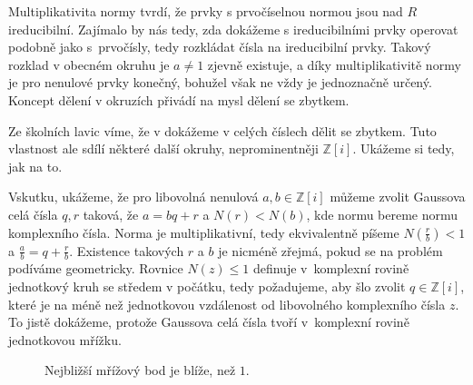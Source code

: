 \documentclass[12pt]{report}
\begin{document}
Multiplikativita normy tvrdí, že prvky s prvočíselnou normou jsou nad $R$ ireducibilní. Zajímalo by nás tedy, zda dokážeme s ireducibilními prvky operovat podobně jako s~prvočísly, tedy rozkládat čísla na ireducibilní prvky. Takový rozklad v obecném okruhu je $a \neq 1$ zjevně existuje, a díky multiplikativitě normy je pro nenulové prvky konečný, bohužel však ne vždy je jednoznačně určený. Koncept dělení v okruzích přivádí na mysl dělení se zbytkem.

Ze školních lavic víme, že v dokážeme v celých číslech dělit se zbytkem. Tuto vlastnost ale sdílí některé další okruhy, neprominentněji $\mathbb{Z}[i]$. Ukážeme si tedy, jak na to.

Vskutku, ukážeme, že pro libovolná nenulová $a,b \in \mathbb{Z}[i]$ můžeme zvolit Gaussova celá čísla $q,r$ taková, že $a = bq+r$ a $N(r) < N(b)$, kde normu bereme normu komplexního čísla.  Norma je multiplikativní, tedy ekvivalentně píšeme $N\left(\frac{r}{b}\right) < 1$ a $\frac{a}{b} = q+\frac{r}{b}$. Existence takových $r$ a $b$ je nicméně zřejmá, pokud se na problém podíváme geometricky. Rovnice $N(z) \leqslant 1$ definuje v~komplexní rovině jednotkový kruh se středem v počátku, tedy požadujeme, aby šlo zvolit $q \in \mathbb{Z}[i]$, které je na méně než jednotkovou vzdálenost od libovolného komplexního čísla $z$. To jistě dokážeme, protože Gaussova celá čísla tvoří v~komplexní rovině jednotkovou mřížku.

\begin{figure}
\begin{center}
\end{center}
\caption{Nejbližší mřížový bod je blíže, než $1$.}
\end{figure}
\end{document}
